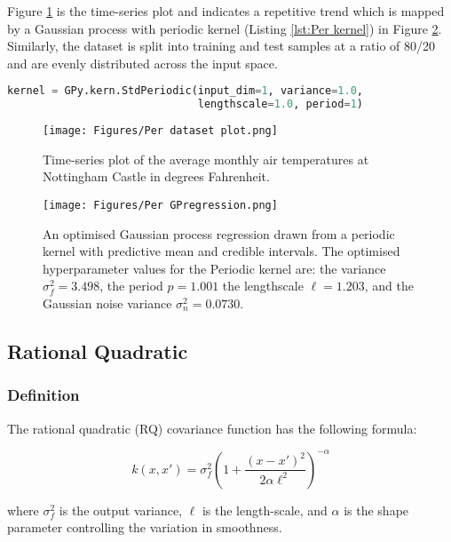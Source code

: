 \documentclass[12pt,a4paper]{article}
\begin{document}
Figure \ref{fig:Per dataset plot} is the time-series plot and indicates a repetitive trend which is mapped by a Gaussian process with periodic kernel (Listing \ref{lst:Per kernel}) in Figure \ref{fig:Per GPregression}. Similarly, the dataset is split into training and test samples at a ratio of 80/20 and are evenly distributed across the input space.

\vspace{10pt}
\begin{lstlisting}[language=python, caption={Code of creating the periodic kernel.}, label={lst:Per kernel}]
kernel = GPy.kern.StdPeriodic(input_dim=1, variance=1.0,           
                              lengthscale=1.0, period=1)
\end{lstlisting}

\begin{figure}[h]
\centering
\texttt{[image: Figures/Per dataset plot.png]} 
\caption{Time-series plot of the average monthly air temperatures at Nottingham Castle in degrees Fahrenheit.} \label{fig:Per dataset plot}
\end{figure}

\begin{figure}[]
\centering
\texttt{[image: Figures/Per GPregression.png]} 
\caption{An optimised Gaussian process regression drawn from a periodic kernel with predictive mean and credible intervals. The optimised hyperparameter values for the Periodic kernel are: the variance \(\sigma_f^2 = 3.498\), the period \(p = 1.001\) the lengthscale \(\ell = 1.203\), and the Gaussian noise variance \(\sigma_n^2 = 0.0730\).} \label{fig:Per GPregression}
\end{figure}

\subsection{Rational Quadratic}
\label{sec:RQ}
\subsubsection{Definition}

The rational quadratic (RQ) covariance function has the following formula:

\begin{equation}
k(x,x') = \sigma_f^2 \left(1 + \frac{(x-x')^2}{2\alpha\ell^2}\right)^{-\alpha}
\end{equation}

where \( \sigma_f^2 \) is the output variance, \( \ell \) is the length-scale, and \( \alpha \) is the shape parameter controlling the variation in smoothness.
\end{document}
